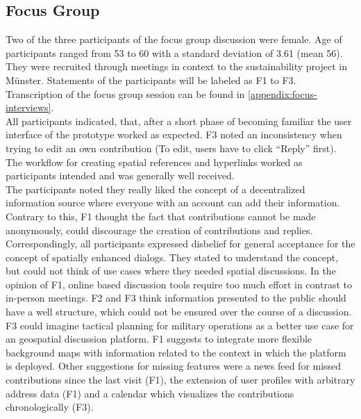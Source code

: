\subsection{Focus Group}
\label{sub:ev_focus}
Two of the three participants of the focus group discussion were female. Age of participants ranged from 53 to 60 with a standard deviation of 3.61 (mean 56). They were recruited through meetings in context to the sustainability project in Münster. Statements of the participants will be labeled as F1 to F3. Transcription of the focus group session can be found in \ref{appendix:focus-interviews}.\\
All participants indicated, that, after a short phase of becoming familiar the user interface of the prototype worked as expected. F3 noted an inconsistency when trying to edit an own contribution (To edit, users have to click ``Reply'' first). The workflow for creating spatial references and hyperlinks worked as participants intended and was generally well received.\\
The participants noted they really liked the concept of a decentralized information source where everyone with an account can add their information. Contrary to this, F1 thought the fact that contributions cannot be made anonymously, could discourage the creation of contributions and replies.\\
Correspondingly, all participants expressed disbelief for general acceptance for the concept of spatially enhanced dialogs. They stated to understand the concept, but could not think of use cases where they needed spatial discussions. In the opinion of F1, online based discussion tools require too much effort in contrast to in-person meetings. F2 and F3 think information presented to the public should have a well structure, which could not be ensured over the course of a discussion. F3 could imagine tactical planning for military operations as a better use case for an geospatial discussion platform. F1 suggests to integrate more flexible background maps with information related to the context in which the platform is deployed. Other suggestions for missing features were a news feed for missed contributions since the last visit (F1), the extension of user profiles with arbitrary address data (F1) and a calendar which visualizes the contributions chronologically (F3).
